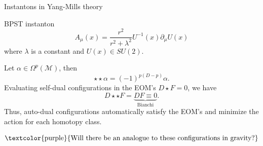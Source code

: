 \documentclass[aspectratio=169,xcolor=dvipsnames]{beamer}
\begin{document}
\begin{frame}{Instantons in Yang-Mills theory}\justifying
{}
    \begin{block}{BPST instanton}
    \begin{equation*}
        A_\mu(x)=\frac{r^2}{r^2+\lambda^2}U^{-1}(x)\partial_\mu U(x)
    \end{equation*}
    where $\lambda$ is a constant and $U(x)\in SU(2)$.
    \end{block}
Let $\alpha\in \Omega^p(\mathcal{M})$, then
    \begin{equation*}
        \star\star \alpha = (-1)^{p(D-p)}\alpha. 
    \end{equation*}
    Evaluating self-dual configurations in the EOM's $D\star F=0$, we have
\begin{equation*}
    D\star\star F=\underbrace{DF\equiv 0}_{\text{Bianchi}}.
\end{equation*}
Thus, auto-dual configurations automatically satisfy the EOM's and  minimize the action for each homotopy class.
\end{frame}

\begin{frame}\justifying
$$\text{\textcolor{purple}{Will there be an analogue to these configurations in gravity?}}$$
\end{frame}

\end{document}
